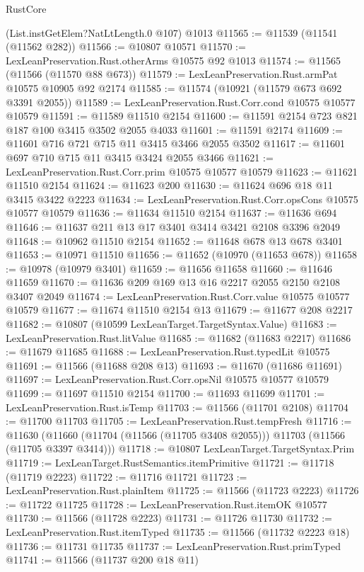 \begin{lexlean}{RustCore}
\begin{coremodule}
    (List.instGetElem?NatLtLength.{0} @107)
    @1013
@11565 := @11539 (@11541 (@11562 @282))
@11566 := @10807 @10571
@11570 := LexLeanPreservation.Rust.otherArms @10575 @92 @1013
@11574 := @11565 (@11566 (@11570 @88 @673))
@11579 := LexLeanPreservation.Rust.armPat @10575 @10905 @92 @2174
@11585 := @11574 (@10921 (@11579 @673 @692 @3391 @2055))
@11589 := LexLeanPreservation.Rust.Corr.cond @10575 @10577 @10579
@11591 := @11589 @11510 @2154
@11600 := @11591 @2154 @723 @821 @187 @100 @3415 @3502 @2055 @4033
@11601 := @11591 @2174
@11609 := @11601 @716 @721 @715 @11 @3415 @3466 @2055 @3502
@11617 := @11601 @697 @710 @715 @11 @3415 @3424 @2055 @3466
@11621 := LexLeanPreservation.Rust.Corr.prim @10575 @10577 @10579
@11623 := @11621 @11510 @2154
@11624 := @11623 @200
@11630 := @11624 @696 @18 @11 @3415 @3422 @2223
@11634 := LexLeanPreservation.Rust.Corr.opsCons @10575 @10577 @10579
@11636 := @11634 @11510 @2154
@11637 := @11636 @694
@11646 := @11637 @211 @13 @17 @3401 @3414 @3421 @2108 @3396 @2049
@11648 := @10962 @11510 @2154
@11652 := @11648 @678 @13 @678 @3401
@11653 := @10971 @11510
@11656 := @11652 (@10970 (@11653 @678))
@11658 := @10978 (@10979 @3401)
@11659 := @11656 @11658
@11660 := @11646 @11659
@11670 := @11636 @209 @169 @13 @16 @2217 @2055 @2150 @2108 @3407 @2049
@11674 := LexLeanPreservation.Rust.Corr.value @10575 @10577 @10579
@11677 := @11674 @11510 @2154 @13
@11679 := @11677 @208 @2217
@11682 := @10807 (@10599 LexLeanTarget.TargetSyntax.Value)
@11683 := LexLeanPreservation.Rust.litValue
@11685 := @11682 (@11683 @2217)
@11686 := @11679 @11685
@11688 := LexLeanPreservation.Rust.typedLit @10575
@11691 := @11566 (@11688 @208 @13)
@11693 := @11670 (@11686 @11691)
@11697 := LexLeanPreservation.Rust.Corr.opsNil @10575 @10577 @10579
@11699 := @11697 @11510 @2154
@11700 := @11693 @11699
@11701 := LexLeanPreservation.Rust.isTemp
@11703 := @11566 (@11701 @2108)
@11704 := @11700 @11703
@11705 := LexLeanPreservation.Rust.tempFresh
@11716 := @11630
    (@11660 (@11704 (@11566 (@11705 @3408 @2055))) @11703 (@11566 (@11705 @3397 @3414)))
@11718 := @10807 LexLeanTarget.TargetSyntax.Prim
@11719 := LexLeanTarget.RustSemantics.itemPrimitive
@11721 := @11718 (@11719 @2223)
@11722 := @11716 @11721
@11723 := LexLeanPreservation.Rust.plainItem
@11725 := @11566 (@11723 @2223)
@11726 := @11722 @11725
@11728 := LexLeanPreservation.Rust.itemOK @10577
@11730 := @11566 (@11728 @2223)
@11731 := @11726 @11730
@11732 := LexLeanPreservation.Rust.itemTyped
@11735 := @11566 (@11732 @2223 @18)
@11736 := @11731 @11735
@11737 := LexLeanPreservation.Rust.primTyped
@11741 := @11566 (@11737 @200 @18 @11)

\end{coremodule}
\end{lexlean}

